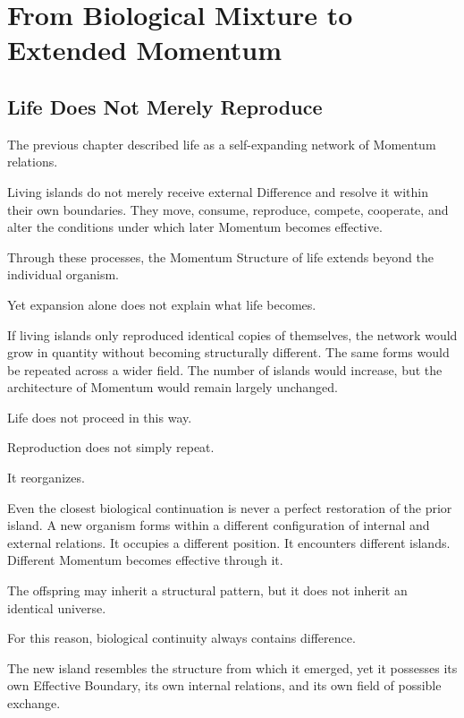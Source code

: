 

\section{From Biological Mixture to Extended Momentum}

\subsection*{\textbf{Life Does Not Merely Reproduce}}

The previous chapter described life as a self-expanding network of Momentum relations.

Living islands do not merely receive external Difference and resolve it within their own boundaries. They move, consume, reproduce, compete, cooperate, and alter the conditions under which later Momentum becomes effective.

Through these processes, the Momentum Structure of life extends beyond the individual organism.

Yet expansion alone does not explain what life becomes.

If living islands only reproduced identical copies of themselves, the network would grow in quantity without becoming structurally different. The same forms would be repeated across a wider field. The number of islands would increase, but the architecture of Momentum would remain largely unchanged.

Life does not proceed in this way.

Reproduction does not simply repeat.

It reorganizes.

Even the closest biological continuation is never a perfect restoration of the prior island. A new organism forms within a different configuration of internal and external relations. It occupies a different position. It encounters different islands. Different Momentum becomes effective through it.

The offspring may inherit a structural pattern, but it does not inherit an identical universe.

For this reason, biological continuity always contains difference.

The new island resembles the structure from which it emerged, yet it possesses its own Effective Boundary, its own internal relations, and its own field of possible exchange.

